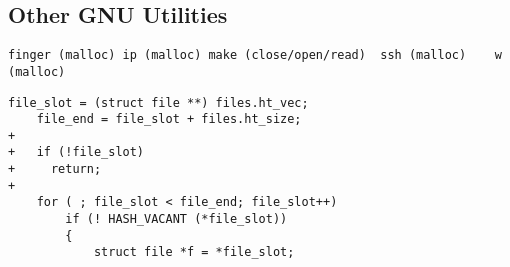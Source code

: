 \subsection{Other GNU Utilities}
\begin{lstlisting}[label={lst:other_crashes},caption={Crashes in other GNU utilities}]
finger (malloc)	ip (malloc)	make (close/open/read)	ssh (malloc)	w (malloc)
\end{lstlisting}


\begin{lstlisting}[label={lst:make/calloc},firstnumber=278, caption={\texttt{make} crashes when \texttt{calloc} returns an error. The offending code is in the Make 4.2 source code, in \texttt{file.c:278}.}]
	file_slot = (struct file **) files.ht_vec;
	file_end = file_slot + files.ht_size;
+	
+	if (!file_slot)
+	  return;
+	
	for ( ; file_slot < file_end; file_slot++)
		if (! HASH_VACANT (*file_slot))
		{
			struct file *f = *file_slot;                                          
\end{lstlisting}
